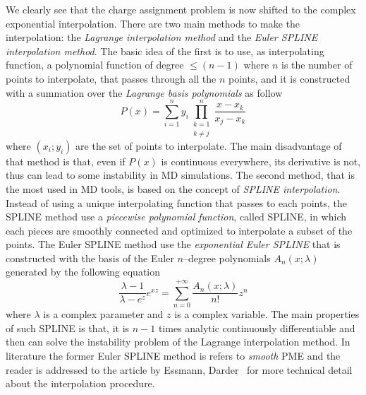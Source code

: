We clearly see that the charge assignment problem is now shifted to the complex exponential interpolation. There are two main methods to make the interpolation: the \textit{Lagrange interpolation method} and the \textit{Euler SPLINE interpolation method}. The basic idea of the first is to use, as interpolating function, a polynomial function of degree $ \le (n-1)$ where $n$ is the number of points to interpolate, that passes through all the $n$ points, and it is constructed with a summation over the \textit{Lagrange basis polynomials} as follow
\begin{equation*}
	P(x) = \sum_{i=1}^n y_i \prod_{\substack{k=1\\k\ne j}}^n \frac{x-x_k}{x_j - x_k}
\end{equation*}
where $(x_i;y_i)$ are the set of points to interpolate. The main disadvantage of that method is that, even if $P(x)$ is continuous everywhere, its derivative is not, thus can lead to some instability in \ac{MD} simulations. The second method, that is the most used in \ac{MD} tools, is based on the concept of \textit{SPLINE interpolation}. Instead of using a unique interpolating function that passes to each points, the SPLINE method use a \textit{piecewise polynomial function}, called SPLINE, in which each pieces are smoothly connected and optimized to interpolate a subset of the points. The Euler SPLINE method use the \textit{exponential Euler SPLINE} that is constructed with the basis of the Euler $n$--degree polynomials $A_n(x;\lambda)$ generated by the following equation
\begin{equation*}
	\frac{\lambda - 1}{\lambda - e^z}e^{xz} = \sum_{n=0}^{+\infty} \frac{A_n(x;\lambda)}{n!}z^n
\end{equation*}
where $\lambda$ is a complex parameter and $z$ is a complex variable. The main properties of such SPLINE is that, it is $n-1$ times analytic continuously differentiable and then can solve the instability problem of the Lagrange interpolation method. In literature the former Euler SPLINE method is refers to \textit{smooth} \acl{PME} and the reader is addressed to the article by Essmann, Darder \etal\, \cite{EssmannSPME} for more technical detail about the interpolation procedure.

